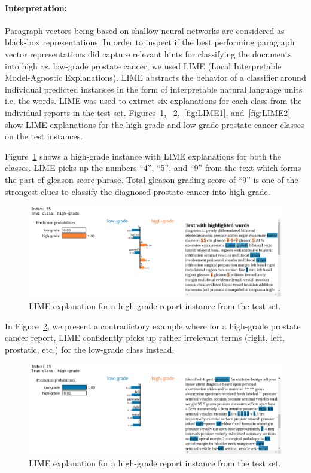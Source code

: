 \documentclass[runningheads]{llncs}
\begin{document}
\paragraph{Interpretation: }
%
Paragraph vectors being based on shallow neural networks are considered as black-box representations.
In order to inspect if the best performing paragraph vector representations did capture relevant hints for classifying the documents into high \textit{vs.} low-grade prostate cancer, we used LIME (Local Interpretable Model-Agnostic Explanations).
LIME abstracts the behavior of a classifier around individual predicted instances in the form of interpretable natural language units i.e. the words.
LIME was used to extract six explanations for each class from the individual reports in the test set. 
Figures~\ref{fig:LIME0}, ~\ref{fig:LIME00},~\ref{fig:LIME1}, and~\ref{fig:LIME2} show LIME explanations for the high-grade and low-grade prostate cancer classes on the test instances.

Figure~\ref{fig:LIME0} shows a high-grade instance with LIME explanations for both the classes.
LIME picks up the numbers ``4'', ``5'', and ``9'' from the text which forms the part of gleason score phrase.
Total gleason grading score of ``9'' is one of the strongest clues to classify the diagnosed prostate cancer into high-grade.
\begin{figure}[h!]
    \centering
    \includegraphics[scale=0.3]{figures/highGrade_strong.png}
    \caption{LIME explanation for a high-grade report instance from the test set.}
    \label{fig:LIME0}
\end{figure}
%

In Figure~\ref{fig:LIME00}, we present a contradictory example where for a high-grade prostate cancer report, LIME confidently picks up rather irrelevant terms (right, left, prostatic, etc.) for the low-grade class instead.
%
\begin{figure}[h!]
    \centering
    \includegraphics[scale=0.3]{figures/irrelevant.png}
    \caption{LIME explanation for a high-grade report instance from the test set.}
    \label{fig:LIME00}
\end{figure}
%
\end{document}
